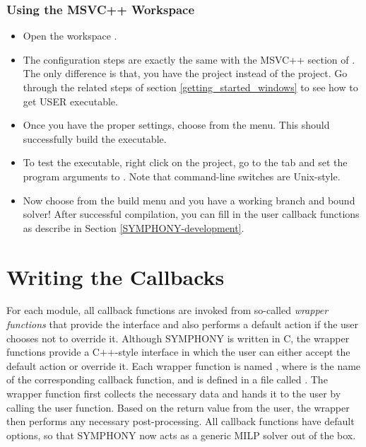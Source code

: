 \subsubsection{Using the MSVC++ Workspace}

\begin{itemize}
\item Open the workspace 
.

\item 
The configuration steps are exactly the same with the MSVC++ section of 
. The only 
difference is that, you have the  project instead of the
 project. Go through the related steps of section 
\ref{getting_started_windows} to see how to get USER executable. 

\item
Once you have the proper settings, choose  from the  menu. This should successfully 
build the executable.

\item
To test the executable, right click on the  project, go to the
 tab and set the program arguments to 
. Note that command-line switches are 
Unix-style.

\item
Now choose  from the build menu and you have a working branch
and bound solver! After successful compilation, you can fill in the user
callback functions as describe in Section \ref{SYMPHONY-development}.
\end{itemize}

\section{Writing the Callbacks}

For each module, all callback functions are invoked from so-called
\emph{wrapper functions} that provide the interface and also performs a
default action if the user chooses not to override it. Although SYMPHONY is
written in C, the wrapper functions provide a C++-style interface in which the
user can either accept the default action or override it. Each wrapper
function is named  , where \code{*} is the name of the
corresponding callback function, and is defined in a file called
. The wrapper function first collects the necessary data
and hands it to the user by calling the user function. Based on the return
value from the user, the wrapper then performs any necessary post-processing.
All callback functions have default options, so that SYMPHONY now acts as a
generic MILP solver out of the box.

